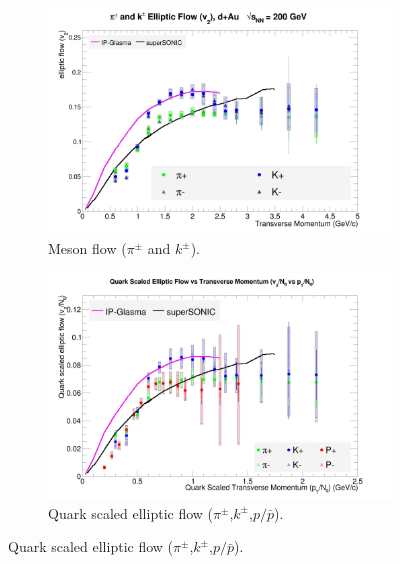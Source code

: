 \begin{figure}[hbtp]
\centering
    \begin{subfigure}[h]{0.48\textwidth}
    \centering
    \includegraphics[width=1\textwidth]{results/v2mesons.jpg}

    \caption{Meson flow ($\pi^{\pm}$ and $k^{\pm}$).}
    \label{fig:smesonflow}
	\end{subfigure}
    \begin{subfigure}[h]{0.48\textwidth}
    \centering
    \includegraphics[width=1\textwidth]{results/v2NqvspTwmodels.jpg}
    \caption{Quark scaled elliptic flow ($\pi^{\pm}$,$k^{\pm}$,$p/\bar{p}$).}
    \label{fig:qscalemesonflow}


\end{subfigure}
\end{figure}
